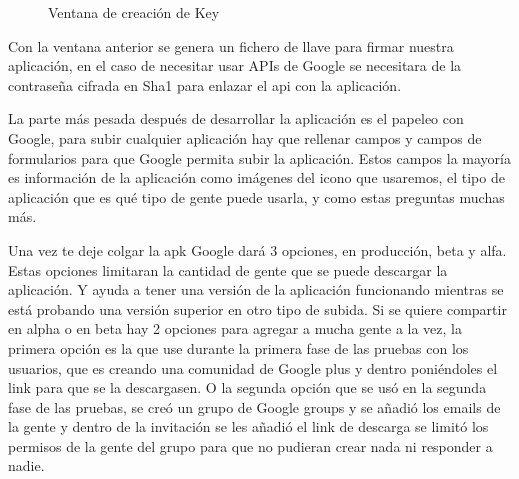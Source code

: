 \begin{figure}[H] 
  \begin{center} 
    \caption{Ventana de creación de Key} 
    \label{fig:CreaciónKey} 
  \end{center} 
\end{figure}

Con la ventana anterior se genera un fichero de llave para firmar nuestra aplicación, en el caso de necesitar usar APIs de Google se necesitara de la contraseña cifrada en Sha1 para enlazar el api con la aplicación.

La parte más pesada después de desarrollar la aplicación es el papeleo con Google, para subir cualquier aplicación hay que rellenar campos y campos de formularios para que Google permita subir la aplicación. Estos campos la mayoría es información de la aplicación como imágenes del icono que usaremos, el tipo de aplicación que es qué tipo de gente puede usarla, y como estas preguntas muchas más.

Una vez te deje colgar la apk Google dará 3 opciones,  en producción, beta  y alfa. Estas opciones limitaran la cantidad de gente que se puede descargar la aplicación. Y ayuda a tener una versión de la aplicación funcionando mientras se está probando una versión superior en otro tipo de subida. 
Si se quiere compartir en alpha o en beta hay 2 opciones para agregar a mucha gente a la vez, la primera opción es la que use durante la primera fase de las pruebas con los usuarios, que es creando una comunidad de Google plus y dentro poniéndoles el link para que se la descargasen. O la segunda opción que se usó en la segunda fase de las pruebas, se creó un grupo de Google groups y se añadió los emails de la gente y dentro de la invitación se les añadió el link de descarga se limitó los permisos de la gente del grupo para que no pudieran crear nada ni responder a nadie.

